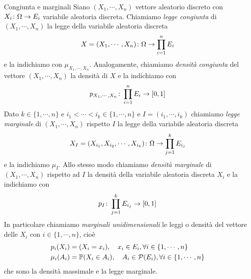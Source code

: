 \documentclass[a4paper]{article}
\begin{document}
\begin{snippetdefinition}{Congiunta e marginali}
    Siano \((X_1, \cdots, X_n)\)
    vettore aleatorio discreto con \(X_i \colon \Omega \to E_i\)
    variabile aleatoria discreta.
    Chiamiamo \emph{legge congiunta} di \((X_1, \cdots, X_n)\)
    la legge della variabile aleatoria discreta
    \[
        X = (X_1, \cdots, X_n) \colon \Omega \to
        \prod_{i=1}^n E_i
    \]
    e la indichiamo con \(\mu_{X_1, \cdots, X_n}\).
    Analogamente, chiamiamo \emph{densità congiunta}
    del vettore \((X_1, \cdots, X_n)\)
    la densità di \(X\) e la indichiamo con
    \[
        p_{X_1, \cdots, X_n}
        \colon \prod_{i=1}^n E_i \to [0,1]
    \]
    Dato \(k \in \{1, \cdots, n\}\)
    e \(i_1 < \cdots < i_k \in \{1, \cdots, n\}\)
    e \(I = (i_1, \cdots, i_k)\) chiamiamo \emph{legge marginale}
    di \((X_1, \cdots, X_n)\) rispetto \(I\) la legge della variabile aleatoria
    discreta
    \[
        X_I = (X_{i_1}, X_{i_2}, \cdots, X_{i_k})
        \colon \Omega \to \prod_{j=1}^k E_{i_j}
    \]
    e la indichiamo \(\mu_I\).
    Allo stesso modo chiamiamo \emph{densità marginale}
    di \((X_1, \cdots, X_n)\)
    rispetto ad \(I\) la densità della variabile aleatoria discreta
    \(X_i\) e la indichiamo con
    \[
        p_I \colon \prod_{j=1}^k E_{i_j} \to [0,1]
    \]
    In particolare chiamiamo \emph{marginali unidimensionali}
    le leggi o densità del vettore
    delle \(X_i\) con \(i \in \{1, \cdots, n\}\), cioè
    \begin{align*}
        p_i(X_i) &= \mathbb(X_i = x_i),
        \quad x_i \in E_i, \forall i \in \{1, \cdots, n\} \\
        \mu_i(A_i) &= \mathbb P(X_i \in A_i),
        \quad A_i \in \mathcal P(E_i), \forall i \in \{1, \cdots, n\}
    \end{align*}
    che sono la densità massimale e la legge marginale.
\end{snippetdefinition}
\end{document}

